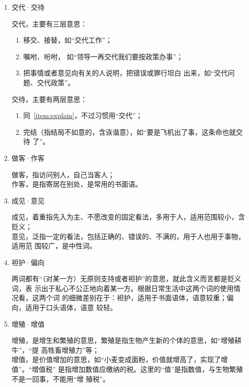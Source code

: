 \documentclass[final,oneside]{ctexbook}
\begin{document}
\begin{enumerate}
    功夫，主要指人的本领怎样、造诣如何。如“他的表演真有功夫”，“演员都得练功夫”。

    这两个词的区别在于“工夫”表示时间，“功夫”不表示时间，指人的本领。

  \item 交代·交待

    交代，主要有三层意思：
    \begin{enumerate}
      \item 移交、接替，如“交代工作”；
      \item 嘱咐、吩咐， 如“领导一再交代我们要按政策办事”；
      \item \label{item:explain}把事情或者意见向有关的人说明，把错误或罪行坦白
        出来，如“交代问题、交代政策”。
    \end{enumerate}

    交待，主要有两层意思：
    \begin{enumerate}
      \item 同~\ref{item:explain}，不过习惯用“交代”；
      \item 完结（指结局不如意的，含诙谐意），如“要是飞机出了事，这条命也就交待
        了”。
    \end{enumerate}

  \item 做客·作客

    做客，指访问别人，自己当客人；\\
    作客，是指寄居在别处，是常用的书面语。

  \item 成见·意见

    成见，着重指先入为主、不愿改变的固定看法，多用于人，适用范围较小，含贬义；\\
    意见，泛指一定的看法，包括正确的、错误的、不满的，用于人也用于事物，适用范
    围较广，是中性词。

  \item 袒护·偏向

    两词都有“（对某一方）无原则支持或者袒护”的意思，就此含义而言都是贬义词，表
    示出于私心不公正地向着某一方。根据日常生活中这两个词的使用情况看，这两个词
    的细微差别在于：袒护，适用于书面语体，语意较重；偏向，适用于口头语体，语意
    较轻。

  \item 增殖·增值

    增殖，是增生和繁殖的意思，繁殖是指生物产生新的个体的意思，如“增殖耕牛”，“提
    高牲畜增殖力”等；\\
    增值，是价值增加的意思，如“小麦变成面粉，价值就增高了，实现了增值”。“增值税”
    是指增加数值应缴纳的税。这里的“值”是指数值，与生物繁殖不是一回事，不能用“增
    殖税”。


\end{enumerate}
\end{document}
